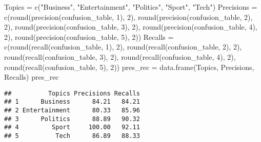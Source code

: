 \documentclass[
]{article}
\newenvironment{Shaded}{\begin{snugshade}}{\end{snugshade}}
\newcommand{\DecValTok}[1]{\textcolor[rgb]{0.00,0.00,0.81}{#1}}
\newcommand{\FunctionTok}[1]{\textcolor[rgb]{0.00,0.00,0.00}{#1}}
\newcommand{\NormalTok}[1]{#1}
\newcommand{\OtherTok}[1]{\textcolor[rgb]{0.56,0.35,0.01}{#1}}
\newcommand{\StringTok}[1]{\textcolor[rgb]{0.31,0.60,0.02}{#1}}
\begin{document}
\begin{Shaded}
\begin{Highlighting}[]
\NormalTok{Topics }\OtherTok{=} \FunctionTok{c}\NormalTok{(}\StringTok{"Business"}\NormalTok{, }\StringTok{"Entertainment"}\NormalTok{, }\StringTok{"Politics"}\NormalTok{, }\StringTok{"Sport"}\NormalTok{, }\StringTok{"Tech"}\NormalTok{)}
\NormalTok{Precisions }\OtherTok{=} \FunctionTok{c}\NormalTok{(}\FunctionTok{round}\NormalTok{(}\FunctionTok{precision}\NormalTok{(confusion\_table, }\DecValTok{1}\NormalTok{), }\DecValTok{2}\NormalTok{), }\FunctionTok{round}\NormalTok{(}\FunctionTok{precision}\NormalTok{(confusion\_table, }\DecValTok{2}\NormalTok{), }\DecValTok{2}\NormalTok{), }
               \FunctionTok{round}\NormalTok{(}\FunctionTok{precision}\NormalTok{(confusion\_table, }\DecValTok{3}\NormalTok{), }\DecValTok{2}\NormalTok{), }\FunctionTok{round}\NormalTok{(}\FunctionTok{precision}\NormalTok{(confusion\_table, }\DecValTok{4}\NormalTok{), }\DecValTok{2}\NormalTok{), }
               \FunctionTok{round}\NormalTok{(}\FunctionTok{precision}\NormalTok{(confusion\_table, }\DecValTok{5}\NormalTok{), }\DecValTok{2}\NormalTok{))}
\NormalTok{Recalls }\OtherTok{=} \FunctionTok{c}\NormalTok{(}\FunctionTok{round}\NormalTok{(}\FunctionTok{recall}\NormalTok{(confusion\_table, }\DecValTok{1}\NormalTok{), }\DecValTok{2}\NormalTok{), }\FunctionTok{round}\NormalTok{(}\FunctionTok{recall}\NormalTok{(confusion\_table, }\DecValTok{2}\NormalTok{), }\DecValTok{2}\NormalTok{),}
            \FunctionTok{round}\NormalTok{(}\FunctionTok{recall}\NormalTok{(confusion\_table, }\DecValTok{3}\NormalTok{), }\DecValTok{2}\NormalTok{), }\FunctionTok{round}\NormalTok{(}\FunctionTok{recall}\NormalTok{(confusion\_table, }\DecValTok{4}\NormalTok{), }\DecValTok{2}\NormalTok{), }
            \FunctionTok{round}\NormalTok{(}\FunctionTok{recall}\NormalTok{(confusion\_table, }\DecValTok{5}\NormalTok{), }\DecValTok{2}\NormalTok{))}
\NormalTok{pres\_rec }\OtherTok{=} \FunctionTok{data.frame}\NormalTok{(Topics, Precisions, Recalls)}
\NormalTok{pres\_rec}
\end{Highlighting}
\end{Shaded}

\begin{verbatim}
##          Topics Precisions Recalls
## 1      Business      84.21   84.21
## 2 Entertainment      80.33   85.96
## 3      Politics      88.89   90.32
## 4         Sport     100.00   92.11
## 5          Tech      86.89   88.33
\end{verbatim}
\end{document}
